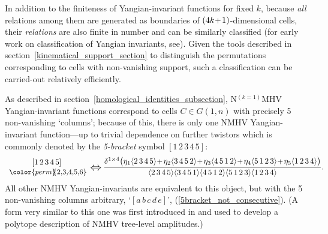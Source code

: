 \documentclass[12pt,hyperref,compress]{JHEP3}
\newcommand{\eq}[1]{\begin{equation}#1\end{equation}}
\newcommand{\pl}{\hspace{0.5pt}\text{{\small+}}\hspace{-0.5pt}}
\newcommand{\ab}[1]{\langle #1 \rangle}
\begin{document}
{In addition to the finiteness of Yangian-invariant functions for fixed $k$, because {\it all} relations among them are generated as boundaries of $(4k\pl\,1)$-dimensional cells, their {\it relations} are also finite in number and can be similarly classified (for early work on classification of Yangian invariants, see\cite{ArkaniHamed:2009dn, ArkaniHamed:2009dg,ArkaniHamed:2009sx,Bullimore:2009cb, Ashok:2010ie}). Given the tools described in \mbox{section \ref{kinematical_support_section}} to distinguish the permutations corresponding to cells with non-vanishing support, such a classification can be carried-out relatively efficiently.

As described in \mbox{section \ref{homological_identities_subsection}}, N$^{(k=1)}$MHV Yangian-invariant functions correspond to cells $C\!\in\!G(1,n)$ with precisely 5 non-vanishing `columns'; because of this, there is only one NMHV Yangian-invariant function---up to trivial dependence on further twistors which is commonly denoted by the {\it 5-bracket} symbol $[1\,2\,3\,4\,5]$:
\eq{\hspace{-.0cm}\begin{array}{c}[1\,2\,3\,4\,5]\\\text{{\small${\color{perm}\!\!\{2,\!3,\!4,\!5,\!6\}}\!\!$}}\end{array}\raisebox{-1.5pt}{{\Large$\,\Leftrightarrow\,$}}\frac{\delta^{1\times4}\big(\eta_1\ab{2\,3\,4\,5}\pl\,\eta_2\ab{3\,4\,5\,2}\pl\,\eta_3\ab{4\,5\,1\,2}\pl\,\eta_4\ab{5\,1\,2\,3}\pl\,\eta_5\ab{1\,2\,3\,4}\big)}{\ab{2\,3\,4\,5}\ab{3\,4\,5\,1}\ab{4\,5\,1\,2}\ab{5\,1\,2\,3}\ab{1\,2\,3\,4}}.\hspace{-0.8cm}\label{r-invariant}}
All other NMHV Yangian-invariants are equivalent to this object, but with the 5 non-vanishing columns arbitrary, `$[a\,b\,c\,d\,e]$', (\ref{5bracket_not_consecutive}). (A form very similar to this one was first introduced in \cite{Hodges:2009hk} and used to develop a polytope description of NMHV tree-level amplitudes.)

}
\end{document}
